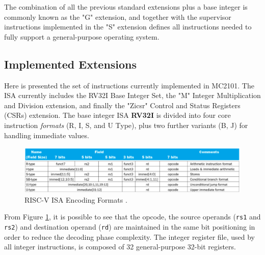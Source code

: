 The combination of all the previous standard extensions plus a base integer is commonly known as the "G" extension, and together with the supervisor instructions implemented in the "S" extension defines all instructions needed to fully support a general-purpose operating system.

\subsection{Implemented Extensions}
Here is presented the set of instructions currently implemented in MC2101. The ISA currently includes the RV32I Base Integer Set, the "M" Integer Multiplication and Division extension, and finally the "Zicsr" Control and Status Registers (CSRs) extension.\vspace{5mm} \newline
The base integer ISA \textbf{RV32I} is divided into four core instruction \emph{formats} (R, I, S, and U Type), plus two further variants (B, J) for handling immediate values.
\begin{figure}[h!]
\vspace{0.5cm}
\includegraphics[width=\textwidth]{./images/rvencodings}
\caption{RISC-V ISA Encoding Formats \cite{lecture04riscv}.}
\label{fig:rve} %
\end{figure} 
From Figure \ref{fig:rve}, it is possible to see that the opcode, the source operands (\texttt{rs1} and \texttt{rs2}) and destination operand (\texttt{rd}) are maintained in the same bit positioning in order to reduce the decoding phase complexity.
The integer register file, used by all integer instructions, is composed of 32 general-purpose 32-bit registers.
